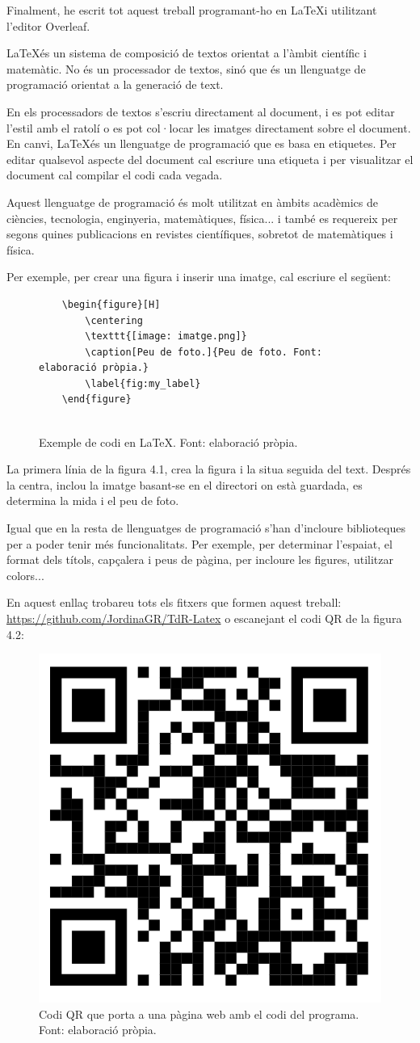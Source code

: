 Finalment, he escrit tot aquest treball programant-ho en \LaTeX \space i utilitzant l'editor Overleaf. 

\LaTeX \space és un sistema de composició de textos orientat a l'àmbit científic i matemàtic. No és un processador de textos, sinó que és un llenguatge de programació orientat a la generació de text.

En els processadors de textos s'escriu directament al document, i es pot editar l'estil amb el ratolí o es pot col·locar les imatges directament sobre el document. En canvi, \LaTeX \space és un llenguatge de programació que es basa en etiquetes. Per editar qualsevol aspecte del document cal escriure una etiqueta i per visualitzar el document cal compilar el codi cada vegada. 

Aquest llenguatge de programació és molt utilitzat en àmbits acadèmics de ciències, tecnologia, enginyeria, matemàtiques, física... i també es requereix per segons quines publicacions en revistes científiques, sobretot de matemàtiques i física.

Per exemple, per crear una figura i inserir una imatge, cal escriure el següent:
\begin{figure}[H]
    \begin{verbatim}
    \begin{figure}[H]
        \centering
        \texttt{[image: imatge.png]}
        \caption[Peu de foto.]{Peu de foto. Font: elaboració pròpia.}
        \label{fig:my_label}
    \end{figure}
    
        \end{verbatim}
        \caption[Exemple de codi en \LaTeX.]{Exemple de codi en \LaTeX. Font: elaboració pròpia.}
        \label{Figura}
\end{figure}%

La primera línia de la figura 4.1, crea la figura i la situa seguida del text. Després la centra, inclou la imatge basant-se en el directori on està guardada, es determina la mida i el peu de foto.

Igual que en la resta de llenguatges de programació s'han d'incloure biblioteques per a poder tenir més funcionalitats. Per exemple, per determinar l'espaiat, el format dels títols, capçalera i peus de pàgina, per incloure les figures, utilitzar colors... 

En aquest enllaç trobareu tots els fitxers que formen aquest treball: \url{https://github.com/JordinaGR/TdR-Latex} o escanejant el codi QR de la figura 4.2:
\begin{figure}[H]
    \centering
    \includegraphics[width=.15\textwidth]{capitols/figures/qrcap4.png}
    \caption[Codi QR que porta a una pàgina web amb el codi del programa.]{Codi QR que porta a una pàgina web amb el codi del programa. Font: elaboració pròpia.}
    \label{fig:my_label}
\end{figure}
